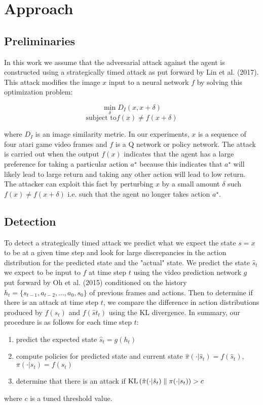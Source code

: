 \section{Approach}

\subsection{Preliminaries}
In this work we assume that the adversarial attack against the agent
is constructed using a strategically timed attack as put forward by
Lin et al. (2017). This attack modifies the image $x$ input to a neural network
$f$ by solving this optimization problem:

$$\min_{\delta}{D_I(x, x + \delta)}$$
$$\mbox{subject to} f(x) \neq f(x + \delta)$$

where $D_I$ is an image similarity metric.
In our experiments, $x$ is a sequence of four atari game video frames
and $f$ is a Q network or policy network. The attack is carried out when
the output $f(x)$ indicates that the agent has a large preference for
taking a particular action $a^\star$ because this indicates that $a^\star$
will likely lead to large return and taking any other action will lead to
low return. The attacker can exploit this fact by perturbing $x$ by a small
amount $\delta$ such $f(x) \neq f(x + \delta)$ i.e. such that the agent no longer
takes action $a^\star$.

\subsection{Detection}
To detect a strategically timed attack we predict what we expect the state $s = x$
to be at a given time step and look for large discrepancies in the
action distribution for the predicted state and the "actual" state.
We predict the state $\hat s_t$ we expect to be input to $f$ at time step $t$
using the video prediction network $g$ put forward by Oh et al. (2015)
conditioned on the history $h_t = \{s_{t-1}, a_{t-2}, \dots, a_0, s_0\}$ of
previous frames and actions. Then to determine if there is an attack
at time step $t$, we compare the difference in action distributions
produced by $f(s_t)$ and $f(\hat st_t)$ using the \textrm{KL} divergence.
In summary, our procedure is as follows for each time step $t$:
\begin{enumerate}
    \item predict the expected state $\hat s_t = g(h_t)$
    \item compute policies for predicted state and current state $\hat \pi( \cdot \vert \hat s_t) = f(\hat s_t)$, $\pi( \cdot \vert s_t) = f(s_t)$
    \item determine that there is an attack if $\textrm{KL}\left(\hat \pi( \cdot \vert \hat s_t)\;\|\;\pi( \cdot \vert s_t)\right) > c$
\end{enumerate}
where $c$ is a tuned threshold value.

